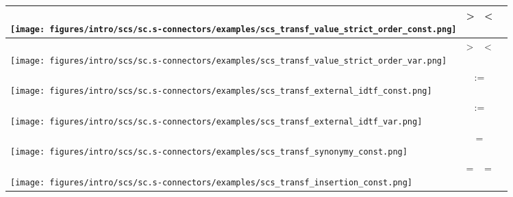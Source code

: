 \begin{SCn}
{\begin{longtable}[l]{|m{6.2cm}|m{2.5cm}|m{2.5cm}|m{2.5cm}|m{2.5cm}|}
	\parbox[c]{6.2cm}{\\\centering\texttt{[image: figures/intro/scs/sc.s-connectors/examples/scs\_transf\_value\_strict\_order\_const.png]}\\} & \parbox[c]{2.5cm}{\centering >} & \parbox[c]{2.5cm}{\centering <} &  \\
	\hline
	
	\parbox[c]{6.2cm}{\\\centering\texttt{[image: figures/intro/scs/sc.s-connectors/examples/scs\_transf\_value\_strict\_order\_var.png]}\\} & \parbox[c]{2.5cm}{\centering\textunderscore>} & \parbox[c]{2.5cm}{\centering <\textunderscore} &  \\
	\hline
	
	\parbox[c]{6.2cm}{\\\centering\texttt{[image: figures/intro/scs/sc.s-connectors/examples/scs\_transf\_external\_idtf\_const.png]}\\} &  &  \\
	\hline
	
	\parbox[c]{6.2cm}{\\\centering\texttt{[image: figures/intro/scs/sc.s-connectors/examples/scs\_transf\_external\_idtf\_var.png]}\\} &  &  \\
	\hline
	
	\parbox[c]{6.2cm}{\\\centering\texttt{[image: figures/intro/scs/sc.s-connectors/examples/scs\_transf\_synonymy\_const.png]}\\} &  &  \\
	\hline
	
	\parbox[c]{6.2cm}{\\\centering\texttt{[image: figures/intro/scs/sc.s-connectors/examples/scs\_transf\_insertion\_const.png]}\\} & \parbox[c]{2.5cm}{\centering\supset=} & \parbox[c]{2.5cm}{\centering = \subset} &    \\
	\hline
\end{longtable}
}


\end{SCn}
